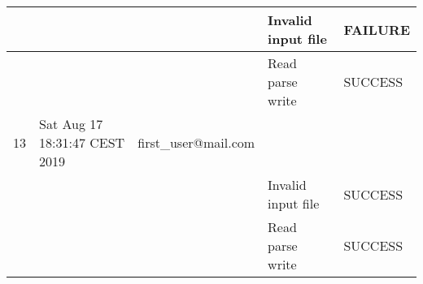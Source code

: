 \begin{table}[H]
{\begin{tabular}{|l|l|l|l|l|}
    &       &                                            & Invalid input file                          & FAILURE                                \\ \hline
    &       &                                            & Read parse write                            & SUCCESS                                \\ \hline
    13 &    Sat Aug 17 18:31:47 CEST 2019        & first\_user@mail.com            &                                             &                                        \\ \hline
    &       &                                            & Invalid input file                          & SUCCESS                                \\ \hline
    &       &                                            & Read parse write                            & SUCCESS                                \\ \hline
\end{tabular}
\label{tab:read_parse_write}

}
\end{table}